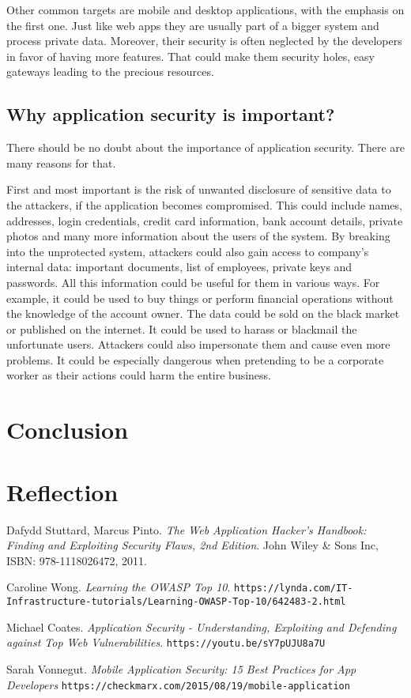 \documentclass[a4paper]{article}
\begin{document}
Other common targets are mobile and desktop applications, with the emphasis on the first one. Just like web apps they are usually part of a bigger system and process private data. Moreover, their security is often neglected by the developers in favor of having more features. That could make them security holes, easy gateways leading to the precious resources. 

\subsection{Why application security is important?}

There should be no doubt about the importance of application security. There are many reasons for that.

First and most important is the risk of unwanted disclosure of sensitive data to the attackers, if the application becomes compromised. This could include names, addresses, login credentials, credit card information, bank account details, private photos and many more information about the users of the system. By breaking into the unprotected system, attackers could also gain access to company's internal data: important documents, list of employees, private keys and passwords. All this information could be useful for them in various ways. For example, it could be used to buy things or perform financial operations without the knowledge of the account owner. The data could be sold on the black market or published on the internet. It could be used to harass or blackmail the unfortunate users. Attackers could also impersonate them and cause even more problems. It could be especially dangerous when pretending to be a corporate worker as their actions could harm the entire business.

\section{Conclusion}

\section{Reflection}

\begin{thebibliography}{9}

		Dafydd Stuttard, Marcus Pinto.
		\textit{The Web Application Hacker's Handbook: Finding and Exploiting Security Flaws, 2nd Edition}.
		John Wiley \& Sons Inc, ISBN: 978-1118026472, 2011.

		Caroline Wong.
		\textit{Learning the OWASP Top 10}.
		\texttt{https://lynda.com/IT-\allowbreak{}Infrastructure-tutorials/Learning-OWASP-Top-10/642483-2.html}
		
		Michael Coates.
		\textit{Application Security - Understanding, Exploiting and Defending against Top Web Vulnerabilities}.
		\texttt{https://youtu.be/sY7pUJU8a7U}

		Sarah Vonnegut.
		\textit{Mobile Application Security: 15 Best Practices for App Developers}
		\texttt{https://checkmarx.com/2015/08/19/mobile-application}
\end{thebibliography}
\end{document}
